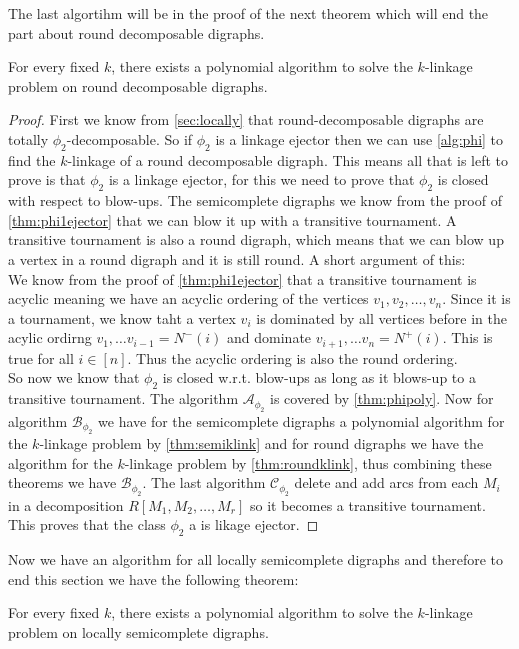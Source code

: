 The last algortihm will be in the proof of the next theorem which will end the part about round decomposable digraphs.
\begin{thm}
    For every fixed $k$, there exists a polynomial algorithm to solve the $k$-linkage problem on round decomposable digraphs.
\end{thm}
\begin{proof}
    First we know from \autoref{sec:locally} that round-decomposable digraphs are totally $\phi_2$-decomposable. 
    So if $\phi_2$ is a linkage ejector then we can use \autoref{alg:phi} to find the $k$-linkage of a round decomposable digraph. 
    This means all that is left to prove is that $\phi_2$ is a linkage ejector, for this we need to prove that $\phi_2$ is closed with respect to blow-ups.
    The semicomplete digraphs we know from the proof of \autoref{thm:phi1ejector} that we can blow it up with a transitive tournament. 
    A transitive tournament is also a round digraph, which means that we can blow up a vertex in a round digraph and it is still round. A short argument of this:\\
    We know from the proof of \autoref{thm:phi1ejector} that a transitive tournament is acyclic meaning we have an acyclic ordering of the vertices $v_1,v_2,\dots , v_n$. 
    Since it is a tournament, we know taht a vertex $v_i$ is dominated by all vertices before in the acylic ordirng $v_1,\dots v_{i-1}=N^-(i)$ and dominate $v_{i+1},\dots v_n=N^+(i)$. 
    This is true for all $i\in[n]$. 
    Thus the acyclic ordering is also the round ordering.\\
    So now we know that $\phi_2$ is closed w.r.t. blow-ups as long as it blows-up to a transitive tournament. 
    The algorithm $\mathcal{A}_{\phi_2}$ is covered by \autoref{thm:phipoly}.
    Now for algorithm $\mathcal{B}_{\phi_2}$ we have for the semicomplete digraphs a polynomial algorithm for the $k$-linkage problem by \autoref{thm:semiklink} and for round digraphs we have the algorithm for the $k$-linkage problem by \autoref{thm:roundklink}, thus combining these theorems we have $\mathcal{B}_{\phi_2}$. 
    The last algorithm $\mathcal{C}_{\phi_2}$ delete and add arcs from each $M_i$ in a decomposition $R[M_1,M_2,\dots , M_r]$ so it becomes a transitive tournament.  
    This proves that the class $\phi_2$ a is likage ejector.
\end{proof}
Now we have an algorithm for all locally semicomplete digraphs and therefore to end this section we have the following theorem:
\begin{thm}
    For every fixed $k$, there exists a polynomial algorithm to solve the $k$-linkage problem on locally semicomplete digraphs.
\end{thm}
